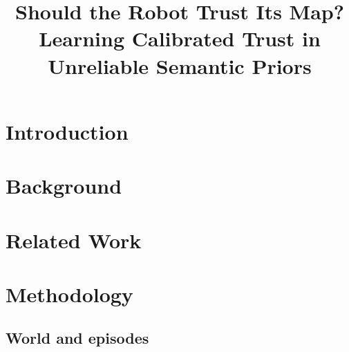\documentclass[conference]{IEEEtran}
\begin{document}
\title{Should the Robot Trust Its Map?\\Learning Calibrated Trust in Unreliable Semantic Priors}

\author{
}

\maketitle

\begin{abstract}
\end{abstract}

\section{Introduction}

\section{Background}

\section{Related Work}

\section{Methodology}
\subsection{World and episodes}
\end{document}
